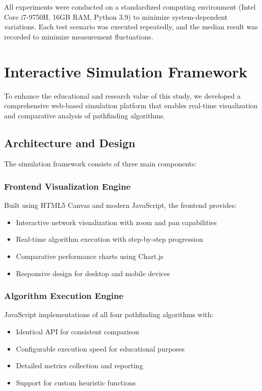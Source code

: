 \documentclass[conference]{IEEEtran}
\begin{document}
All experiments were conducted on a standardized computing environment (Intel Core i7-9750H, 16GB RAM, Python 3.9) to minimize system-dependent variations. Each test scenario was executed repeatedly, and the median result was recorded to minimize measurement fluctuations.

\section{Interactive Simulation Framework}

To enhance the educational and research value of this study, we developed a comprehensive web-based simulation platform that enables real-time visualization and comparative analysis of pathfinding algorithms.

\subsection{Architecture and Design}

The simulation framework consists of three main components:

\subsubsection{Frontend Visualization Engine}
Built using HTML5 Canvas and modern JavaScript, the frontend provides:
\begin{itemize}
\item Interactive network visualization with zoom and pan capabilities
\item Real-time algorithm execution with step-by-step progression
\item Comparative performance charts using Chart.js
\item Responsive design for desktop and mobile devices
\end{itemize}

\subsubsection{Algorithm Execution Engine}
JavaScript implementations of all four pathfinding algorithms with:
\begin{itemize}
\item Identical API for consistent comparison
\item Configurable execution speed for educational purposes
\item Detailed metrics collection and reporting
\item Support for custom heuristic functions
\end{itemize}
\end{document}
